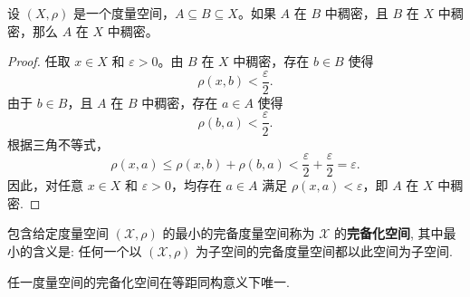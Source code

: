 \documentclass[../../main.tex]{subfiles}%
\begin{document}
\begin{proposition}[稠密子集的传递性]\label{proposition:稠密子集的传递性}
设 $(X,\rho)$ 是一个度量空间，$A \subseteq B \subseteq X$。如果 $A$ 在 $B$ 中稠密，且 $B$ 在 $X$ 中稠密，那么 $A$ 在 $X$ 中稠密。
\end{proposition}
\begin{proof}
任取 $x\in X$ 和 $\varepsilon>0$。由 $B$ 在 $X$ 中稠密，存在 $b\in B$ 使得
\[
\rho(x,b) < \frac{\varepsilon}{2}.
\]
由于 $b\in B$，且 $A$ 在 $B$ 中稠密，存在 $a\in A$ 使得
\[
\rho(b,a) < \frac{\varepsilon}{2}.
\]
根据三角不等式，
\[
\rho(x,a) \leqslant \rho(x,b) + \rho(b,a) < \frac{\varepsilon}{2} + \frac{\varepsilon}{2} = \varepsilon.
\]
因此，对任意 $x\in X$ 和 $\varepsilon>0$，均存在 $a\in A$ 满足 $\rho(x,a)<\varepsilon$，即 $A$ 在 $X$ 中稠密.
\end{proof}

\begin{definition}[完备化空间]
包含给定度量空间 $(\mathscr{X},\rho)$ 的最小的完备度量空间称为 $\mathscr{X}$ 的\textbf{完备化空间}, 其中最小的含义是: 任何一个以 $(\mathscr{X},\rho)$ 为子空间的完备度量空间都以此空间为子空间.
\end{definition}
\begin{remark}
任一度量空间的完备化空间在等距同构意义下唯一.
\end{remark}
\end{document}
